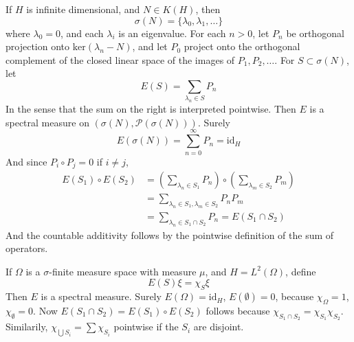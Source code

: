 \begin{example}
    If $H$ is infinite dimensional, and $N \in K(H)$, then
    \[ \sigma(N) = \{ \lambda_0, \lambda_1, \dots \} \]
    where $\lambda_0 = 0$, and each $\lambda_i$ is an eigenvalue. For each $n > 0$, let $P_n$ be orthogonal projection onto $\text{ker}(\lambda_n - N)$, and let $P_0$ project onto the orthogonal complement of the closed linear space of the images of $P_1, P_2, \dots$. For $S \subset \sigma(N)$, let
    \[ E(S) = \sum_{\lambda_n \in S} P_n \]
    In the sense that the sum on the right is interpreted pointwise. Then $E$ is a spectral measure on $(\sigma(N), \mathcal{P}(\sigma(N)))$. Surely
    \[ E(\sigma(N)) = \sum_{n = 0}^\infty P_n = \text{id}_H \]
    And since $P_i \circ P_j = 0$ if $i \neq j$,
    \begin{align*}
        E(S_1) \circ E(S_2) &= \left( \sum_{\lambda_n \in S_1} P_n \right) \circ  \left( \sum_{\lambda_m \in S_2} P_m \right)\\
        &= \sum_{\lambda_n \in S_1, \lambda_m \in S_2} P_n P_m\\
        &= \sum_{\lambda_n \in S_1 \cap S_2} P_n = E(S_1 \cap S_2)
    \end{align*}
    And the countable additivity follows by the pointwise definition of the sum of operators.
\end{example}

\begin{example}
    If $\Omega$ is a $\sigma$-finite measure space with measure $\mu$, and $H = L^2(\Omega)$, define
    \[ E(S) \xi = \chi_S \xi \]
    Then $E$ is a spectral measure. Surely $E(\Omega) = \text{id}_H$, $E(\emptyset) = 0$, because $\chi_\Omega = 1$, $\chi_\emptyset = 0$. Now $E(S_1 \cap S_2) = E(S_1) \circ E(S_2)$ follows because $\chi_{S_1 \cap S_2} = \chi_{S_1} \chi_{S_2}$. Similarily, $\chi_{\bigcup S_i} = \sum \chi_{S_i}$ pointwise if the $S_i$ are disjoint.
\end{example}

